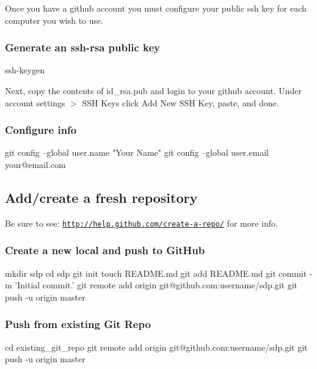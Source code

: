 Once you have a github account you must configure your public ssh key for each computer you wish to use.

\subsubsection*{Generate an ssh-\/rsa public key}

ssh-\/keygen

Next, copy the contents of id\-\_\-rsa.\-pub and login to your github account. Under account settings $>$ S\-S\-H Keys click Add New S\-S\-H Key, paste, and done.

\subsubsection*{Configure info}

\begin{DoxyVerb}git config --global user.name "Your Name"
git config --global user.email your@email.com
\end{DoxyVerb}


\subsection*{Add/create a fresh repository }

Be sure to see\-: \href{http://help.github.com/create-a-repo/}{\tt http\-://help.\-github.\-com/create-\/a-\/repo/} for more info.

\subsubsection*{Create a new local and push to Git\-Hub}

\begin{DoxyVerb}mkdir sdp
cd sdp
git init
touch README.md
git add README.md
git commit -m 'Initial commit.'
git remote add origin git@github.com:username/sdp.git
git push -u origin master
\end{DoxyVerb}


\subsubsection*{Push from existing Git Repo}

\begin{DoxyVerb}cd existing_git_repo
git remote add origin git@github.com:username/sdp.git
git push -u origin master\end{DoxyVerb}
 